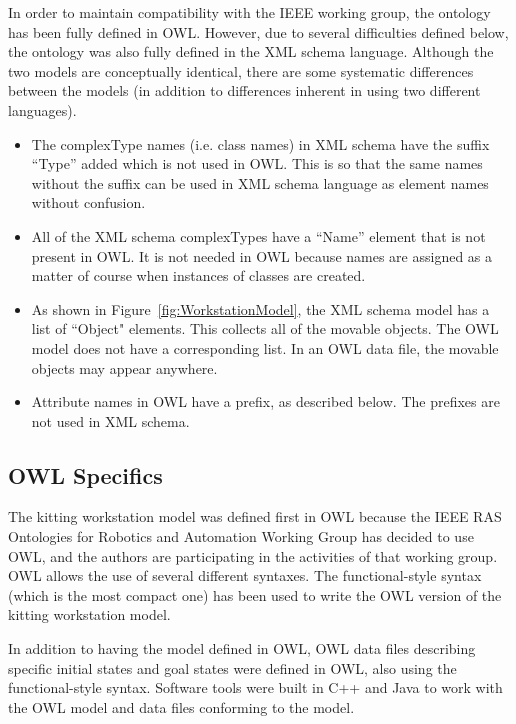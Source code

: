 In order to maintain compatibility with the IEEE working group,
the ontology has been fully defined in OWL. However, due to
several difficulties defined below, the ontology was also fully defined
in the XML schema language. 
Although the two 
models are conceptually identical, there
are some systematic differences between the models (in addition to
differences inherent in using two different languages).

\begin{itemize}
\item The complexType names (i.e. class names) in XML schema have the
  suffix ``Type'' added which is not used in OWL. This is so that the same
  names without the suffix can be used in XML schema language as element
  names without confusion.

\item All of the XML schema complexTypes have a ``Name'' element that is
  not present in OWL. It is not needed in OWL because names are assigned as
  a matter of course when instances of classes are created.

\item As shown in Figure~\ref{fig:WorkstationModel}, the XML schema model has a list of ``Object"
elements. This collects all of the movable objects. The OWL model does not
have a corresponding list. In an OWL data file, the movable objects may
appear anywhere.

\item Attribute names in OWL have a prefix, as described below. The
  prefixes are not used in XML schema.
\end{itemize}

\subsection{OWL Specifics}
The kitting workstation model was defined first in OWL because the IEEE RAS
Ontologies for Robotics and Automation Working Group has decided to use
OWL, and the authors are participating in the activities of that working
group. OWL allows the use of several different syntaxes. The
functional-style syntax (which is the most compact one) has been used to
write the OWL version of the kitting workstation model.

In addition to having the model defined in OWL, OWL data files describing
specific initial states and goal states were defined in OWL, also using the
functional-style syntax.  Software tools were built in C++ and Java to work with the
OWL model and data files conforming to the model.

